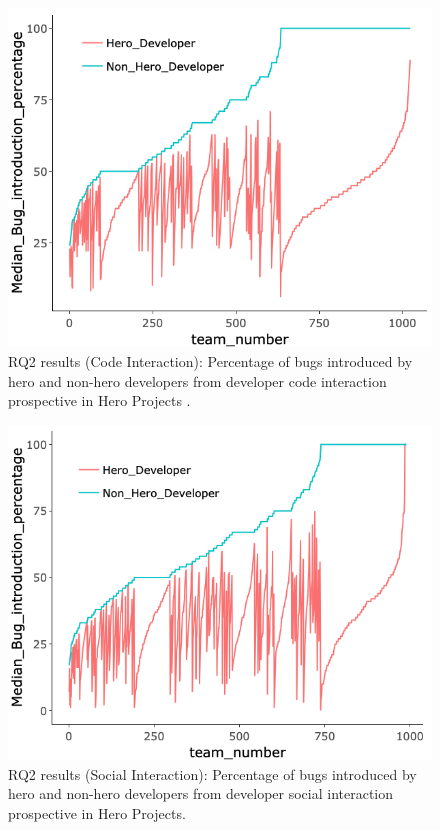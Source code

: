 \documentclass[sigconf,review]{acmart}
\begin{document}
\begin{figure}[!t]
\includegraphics[width=.9\linewidth]{RQ2_Code.png}
\caption{RQ2 results (Code Interaction): Percentage of bugs introduced by hero and non-hero developers from developer code interaction prospective in Hero Projects .}
\label{fig:RQ2_code}
\end{figure}


\begin{figure}[!t]
\includegraphics[width=.9\linewidth]{RQ2_Social.png}
\caption{RQ2 results (Social Interaction): Percentage of bugs introduced by hero and non-hero developers from developer social interaction prospective in Hero Projects.}
\label{fig:RQ2_social}
\end{figure}
\end{document}
